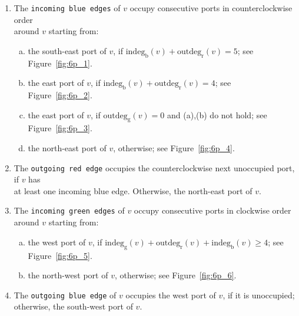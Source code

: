 \documentclass[a4paper,twoside,11pt]{article}
\newcommand{\indeg}[2]{\mathrm{indeg}_{\mathrm{#1}}(#2)}
\newcommand{\outdeg}[2]{\mathrm{outdeg}_{\mathrm{#1}}(#2)}
\begin{document}
\begin{algorithm}[t!]
\DontPrintSemicolon
{}

\BlankLine
\begin{enumerate}[{R}1:] 
\item \label{c1} The \texttt{incoming blue edges} of $v$ occupy
consecutive ports in counterclockwise order\\around $v$ starting
from:

\begin{enumerate}[a.]
\item \label{c1a} the south-east port of $v$, if $\indeg{b}{v} + \outdeg{r}{v}=5$; 
see Figure~\ref{fig:6p_1}.
\item \label{c1b} the east port of $v$, if $\indeg{b}{v} +
\outdeg{r}{v}=4$; see Figure~\ref{fig:6p_2}.
\item \label{c1c} the east port of $v$, if $\outdeg{g}{v}=0$ and
(a),(b) do not hold; see Figure~\ref{fig:6p_3}. 
\item \label{c1d} the north-east port of $v$, otherwise;
see Figure~\ref{fig:6p_4}.
\end{enumerate} 

\medskip

\item \label{c2} The \texttt{outgoing red edge} occupies the
counterclockwise next unoccupied port, if $v$ has\\at least
one incoming blue edge. Otherwise, the north-east port of $v$.

\medskip

\item The \label{c3} \texttt{incoming green edges} of $v$ occupy
consecutive ports in clockwise order around $v$ starting from:

\begin{enumerate}[a.]
\item \label{c3a} the west port of $v$, if $\indeg{g}{v} + \outdeg{r}{v} + \indeg{b}{v} \geq 4$; 
see Figure~\ref{fig:6p_5}.
\item \label{c3b} the north-west port of $v$, otherwise; 
see Figure~\ref{fig:6p_6}.
\end{enumerate} 

\medskip

\item \label{c4} The \texttt{outgoing blue edge} of $v$ occupies the
west port of $v$, if it is unoccupied;\\otherwise, the south-west
port of $v$.


\end{enumerate}
\end{algorithm}
\end{document}
